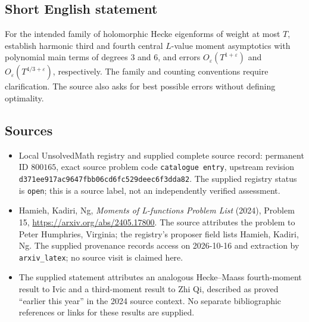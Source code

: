 \documentclass[11pt]{article}
\begin{document}
\subsection{Short English statement}
For the intended family of holomorphic Hecke eigenforms of weight at most \(T\), establish harmonic third and fourth central \(L\)-value moment asymptotics with polynomial main terms of degrees \(3\) and \(6\), and errors \(O_{\varepsilon}(T^{1+\varepsilon})\) and \(O_{\varepsilon}(T^{4/3+\varepsilon})\), respectively. The family and counting conventions require clarification. The source also asks for best possible errors without defining optimality.
\subsection{Sources}
\begin{itemize}
\item Local UnsolvedMath registry and supplied complete source record: permanent ID \(800165\), exact source problem code \texttt{catalogue entry}, upstream revision \texttt{d371ee917ac9647fbb06cd6fc529deec6f3dda82}. The supplied registry status is \texttt{open}; this is a source label, not an independently verified assessment.
\item Hamieh, Kadiri, Ng, \emph{Moments of L-functions Problem List} (2024), Problem 15, \url{https://arxiv.org/abs/2405.17800}. The source attributes the problem to Peter Humphries, Virginia; the registry's proposer field lists Hamieh, Kadiri, Ng. The supplied provenance records access on 2026-10-16 and extraction by \texttt{arxiv\_latex}; no source visit is claimed here.
\item The supplied statement attributes an analogous Hecke--Maass fourth-moment result to Ivic and a third-moment result to Zhi Qi, described as proved ``earlier this year'' in the 2024 source context. No separate bibliographic references or links for these results are supplied.
\end{itemize}
\end{document}
